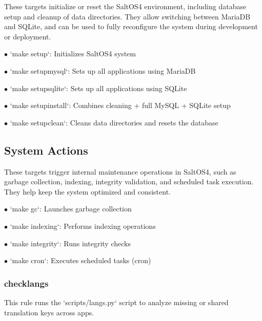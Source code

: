 \documentclass[a4paper]{article}
\begin{document}
These targets initialize or reset the SaltOS4 environment, including database setup and cleanup of data directories. They allow switching between MariaDB and SQLite, and can be used to fully reconfigure the system during development or deployment.

\begin{compactitem}
\item[\color{myblue}$\bullet$] `make setup`: Initializes SaltOS4 system
\item[\color{myblue}$\bullet$] `make setupmysql`: Sets up all applications using MariaDB
\item[\color{myblue}$\bullet$] `make setupsqlite`: Sets up all applications using SQLite
\item[\color{myblue}$\bullet$] `make setupinstall`: Combines cleaning + full MySQL + SQLite setup
\item[\color{myblue}$\bullet$] `make setupclean`: Cleans data directories and resets the database
\end{compactitem}

\hypertarget{toc66}{}
\subsection{System Actions}

These targets trigger internal maintenance operations in SaltOS4, such as garbage collection, indexing, integrity validation, and scheduled task execution. They help keep the system optimized and consistent.

\begin{compactitem}
\item[\color{myblue}$\bullet$] `make gc`: Launches garbage collection
\item[\color{myblue}$\bullet$] `make indexing`: Performs indexing operations
\item[\color{myblue}$\bullet$] `make integrity`: Runs integrity checks
\item[\color{myblue}$\bullet$] `make cron`: Executes scheduled tasks (cron)
\end{compactitem}

\hypertarget{toc67}{}
\subsubsection{checklangs}

This rule runs the `scripts/langs.py` script to analyze missing or shared translation keys across apps.
\end{document}
